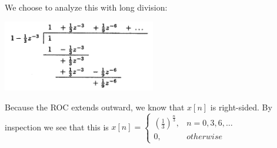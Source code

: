 \documentclass[11pt]{article}
\begin{document}
We choose to analyze this with long division:

\includegraphics[width=0.5\textwidth]{Soln4/p3d.png} 

Because the ROC extends outward, we know that $x[n]$ is right-sided. By inspection we see that this is $x[n] = \begin{cases}
\left(\frac{1}{3}\right)^\frac{n}{3}, & n = 0,3,6,\ldots \\
0, & otherwise
\end{cases}$
\end{document}
